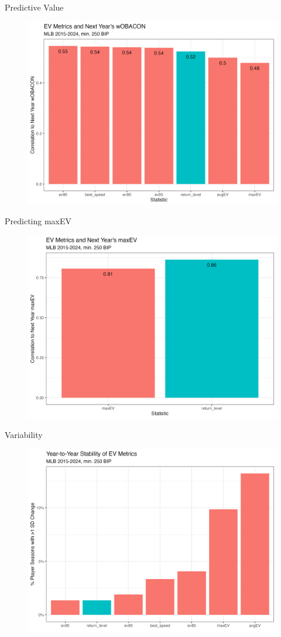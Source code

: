 \documentclass{beamer}
\begin{document}
\begin{frame}{Predictive Value}
    \begin{figure}
        \centering
        \includegraphics[width=0.85\linewidth]{plots/woba_next_correlation.png}
    \end{figure}
\end{frame}

\begin{frame}{Predicting maxEV}
    \begin{figure}
        \centering
        \includegraphics[width=0.85\linewidth]{plots/maxev_next_correlation.png}
    \end{figure}
\end{frame}

\begin{frame}{Variability}
    \begin{figure}
        \centering
        \includegraphics[width=0.85\linewidth]{plots/stability.png}
    \end{figure}
\end{frame}

\begin{frame}[allowframebreaks]
    \printbibliography
\end{frame}
\end{document}
